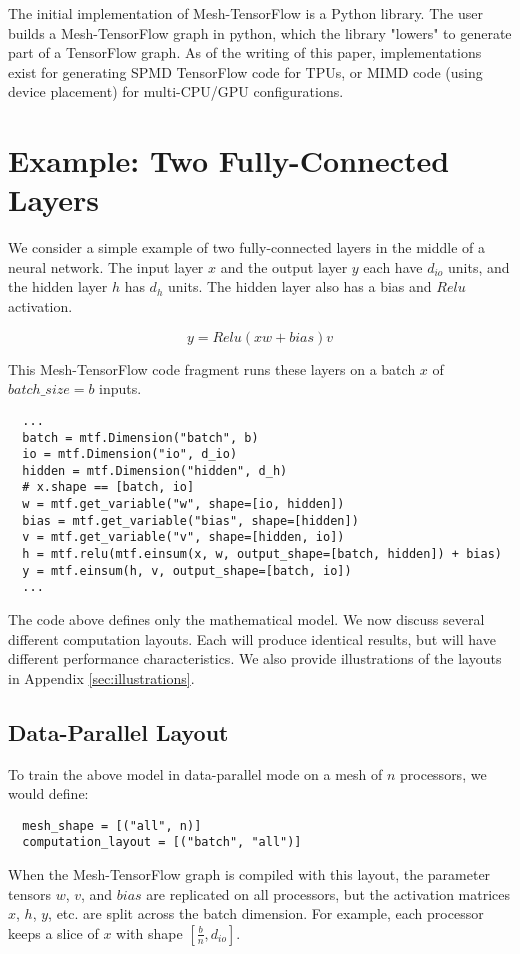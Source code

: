 \documentclass{article}
\begin{document}
The initial implementation of Mesh-TensorFlow is a Python library.  The user builds a Mesh-TensorFlow graph in python, which the library "lowers" to generate part of a TensorFlow graph.  As of the writing of this paper, implementations exist for generating SPMD TensorFlow code for TPUs, or MIMD code (using device placement) for multi-CPU/GPU configurations.







\section{Example: Two Fully-Connected Layers} \label{example}
We consider a simple example of two fully-connected layers in the middle of a neural network.  The input layer $x$ and the output layer $y$ each have $d_{io}$ units, and the hidden layer $h$ has $d_h$ units.  The hidden layer also has a bias and $Relu$ activation.

\begin{equation}
    y = Relu(xw + bias)v
\end{equation}


This Mesh-TensorFlow code fragment runs these layers on a batch $x$ of $batch\_size=b$ inputs.

\begin{verbatim}
  ...
  batch = mtf.Dimension("batch", b)
  io = mtf.Dimension("io", d_io)
  hidden = mtf.Dimension("hidden", d_h)
  # x.shape == [batch, io]
  w = mtf.get_variable("w", shape=[io, hidden])
  bias = mtf.get_variable("bias", shape=[hidden])
  v = mtf.get_variable("v", shape=[hidden, io])
  h = mtf.relu(mtf.einsum(x, w, output_shape=[batch, hidden]) + bias)
  y = mtf.einsum(h, v, output_shape=[batch, io])
  ...
\end{verbatim}

The code above defines only the mathematical model.  We now discuss several different computation layouts.  Each will produce identical results, but will have different performance characteristics. We also provide illustrations of the layouts in Appendix \ref{sec:illustrations}.

\subsection{Data-Parallel Layout}
To train the above model in data-parallel mode on a mesh of $n$ processors, we would define:
\begin{verbatim}
  mesh_shape = [("all", n)]
  computation_layout = [("batch", "all")]
\end{verbatim}
When the Mesh-TensorFlow graph is compiled with this layout, the parameter tensors $w$, $v$, and $bias$ are replicated on all processors, but the activation matrices $x$, $h$, $y$, etc. are split across the batch dimension.  For example, each processor keeps a slice of $x$ with shape $[\frac{b}{n}, d_{io}]$.
\end{document}
